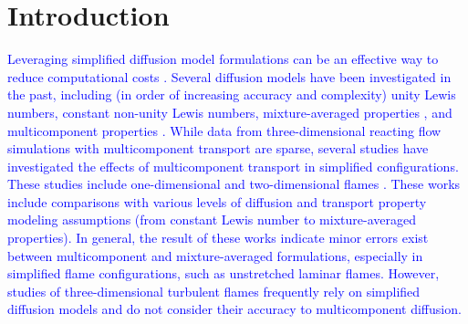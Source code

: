 \documentclass[preprint,review,12pt]{elsarticle}
\begin{document}
\ifdefined \wordcount
\clearpage
\fi

\section{Introduction}\label{Introduction}
\textcolor{blue}{Leveraging simplified diffusion model formulations can be an effective way to reduce computational costs \cite{Xin:2015,Burali2016AssessmentFlows}.
Several diffusion models have been investigated in the past, including (in order of increasing accuracy and complexity) unity Lewis numbers, constant non-unity Lewis numbers, mixture-averaged properties \cite{Bird1960}, and multicomponent properties \cite{Hirschfelder1954}.
While data from three-dimensional reacting flow simulations with multicomponent transport are sparse, several studies have investigated the effects of multicomponent transport in simplified configurations.
These studies include one-dimensional \cite{Coffee:1981,Warnatz:1982, Ern:1999, Bongers:2003, Xin:2015} and two-dimensional flames \cite{Charentenay:2002}. 
These works include comparisons with various levels of diffusion and transport property modeling assumptions (from constant Lewis number to mixture-averaged properties).
In general, the result of these works indicate minor errors exist between multicomponent and mixture-averaged formulations, especially in simplified flame configurations, such as unstretched laminar flames.  
However, studies of three-dimensional turbulent flames frequently rely on simplified diffusion models and do not consider their accuracy to multicomponent diffusion.}
\end{document}
